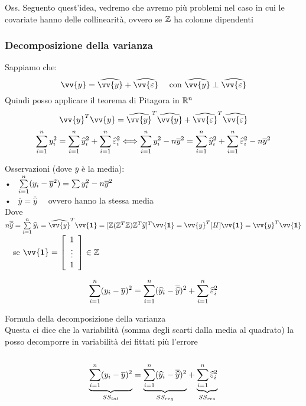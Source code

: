 Oss. Seguento quest'idea, vedremo che avremo più problemi nel caso in cui le covariate hanno delle collinearità, ovvero se $\mathbb Z$ ha colonne dipendenti\\



\subsubsection*{Decomposizione della varianza}

Sappiamo che:
\[
\vv{y}=\hat{\vv{y}}+\hat{\vv{\eps}} \ \ \ \text{ con } \hat{\vv{y}}\perp \hat{\vv{\eps}}
\]
Quindi posso applicare il teorema di Pitagora in $\mathbb R^n$
\[
\vv{y}^T\vv{y}=\hat{\vv{y}}^T\hat{\vv{y}} + \hat{\vv{\eps}}^T\hat{\vv{\eps}}
\]
\[
\sum\limits_{i=1}^{n} y_i^2 = \sum\limits_{i=1}^{n}\widehat{y}_i^2 + \sum\limits_{i=1}^{n} \widehat{\varepsilon}_i^2 \Longleftrightarrow \sum\limits_{i=1}^{n} y_i^2 - n \overline{y}^2 = \sum\limits_{i=1}^{n} \widehat{y}_i^2  + \sum\limits_{i=1}^{n} \widehat{\varepsilon}_i^2 - n\overline{y}^2
\]

Osservazioni (dove $\overline{y}$ è la media):\\
• \ $\sum\limits_{i=1}^{n}(y_i-\overline{y}^2)=\sum y_i^2 -n\overline{y}^2$\\
• \ $\overline{y}=\overline{\hat{y}}$ \ \ ovvero hanno la stessa media\\
Dove \ $n\overline{\hat{y}}=\Sum{i=1}{n} \hat{y}_i = \hat{\vv{y}}^T\vv{\textbf{1}} = [\ZZ(\ZZ^T\ZZ)\ZZ^T\hat{y}]^T\vv{\textbf{1}} = \vv{y}^T[H]\vv{\textbf{1}} = \vv{y}^T\vv{\textbf{1}}$ \ \ se $\vv{\textbf{1}} = \OO\begin{array}{c}
     1  \\
     \vdots\\
     1
\end{array}\CC \in \ZZ$

\[
\sum\limits_{i=1}^{n} (y_i-\overline{y})^2 = \sum\limits_{i=1}^{n} (\widehat{y}_i-\overline{\widehat{y}})^2 + \sum\limits_{i=1}^{n}\widehat{\varepsilon}_i^2
\]

Formula della decomposizione della varianza\\
Questa ci dice che la variabilità (somma degli scarti dalla media al quadrato) la posso decomporre in variabilità dei fittati più l'errore\\


\\

\[
\underset{SS_{tot}}{\underbrace{\sum\limits_{i=1}^{n} (y_i-\overline{y})^2}} = \underset{SS_{reg}}{\underbrace{\sum\limits_{i=1}^{n} (\widehat{y}_i-\overline{\widehat{y}})^2}} + \underset{SS_{res}}{\underbrace{\sum\limits_{i=1}^{n}\widehat{\varepsilon}_i^2}}
\]

